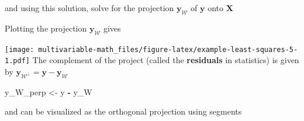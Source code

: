 \documentclass[
]{book}
\newenvironment{Shaded}{\begin{snugshade}}{\end{snugshade}}
\newcommand{\CommentTok}[1]{\textcolor[rgb]{0.56,0.35,0.01}{\textit{#1}}}
\newcommand{\DataTypeTok}[1]{\textcolor[rgb]{0.13,0.29,0.53}{#1}}
\newcommand{\DecValTok}[1]{\textcolor[rgb]{0.00,0.00,0.81}{#1}}
\newcommand{\KeywordTok}[1]{\textcolor[rgb]{0.13,0.29,0.53}{\textbf{#1}}}
\newcommand{\NormalTok}[1]{#1}
\newcommand{\OperatorTok}[1]{\textcolor[rgb]{0.81,0.36,0.00}{\textbf{#1}}}
\newcommand{\StringTok}[1]{\textcolor[rgb]{0.31,0.60,0.02}{#1}}
\theoremstyle{definition}
\theoremstyle{definition}
\theoremstyle{definition}
\theoremstyle{definition}
\theoremstyle{remark}
\begin{document}
and using this solution, solve for the projection \(\mathbf{y}_{\mathcal{W}}\) of \(\mathbf{y}\) onto \(\mathbf{X}\)

\begin{Shaded}
\end{Shaded}

Plotting the projection \(\mathbf{y}_{\mathcal{W}}\) gives

\begin{Shaded}
\end{Shaded}

\texttt{[image: multivariable-math\_files/figure-latex/example-least-squares-5-1.pdf]}
The complement of the project (called the \textbf{residuals} in statistics) is given by \(\mathbf{y}_{\mathcal{W}^\perp} = \mathbf{y} - \mathbf{y}_{\mathcal{W}}\)

\begin{Shaded}
\begin{Highlighting}[]
\NormalTok{y_W_perp <-}\StringTok{ }\NormalTok{y }\OperatorTok{-}\StringTok{ }\NormalTok{y_W}
\end{Highlighting}
\end{Shaded}

and can be visualized as the orthogonal projection using segments
\end{document}

